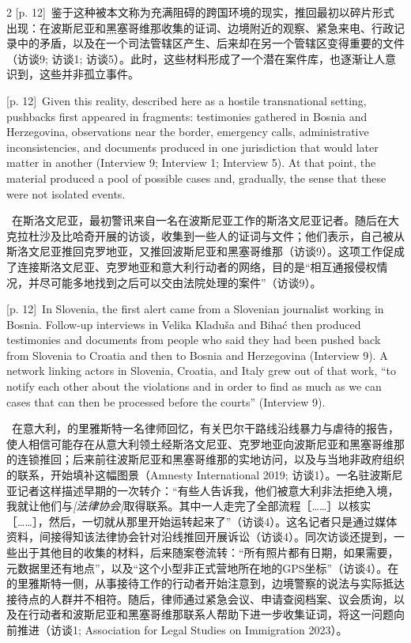 \documentclass[10pt,a4paper]{article}
\begin{document}
\begin{paracol}{2}
{\scriptsize\color{gray} [p. 12]}\ 鉴于这种被本文称为充满阻碍的跨国环境的现实，推回最初以碎片形式出现：在波斯尼亚和黑塞哥维那收集的证词、边境附近的观察、紧急来电、行政记录中的矛盾，以及在一个司法管辖区产生、后来却在另一个管辖区变得重要的文件（访谈9; 访谈1; 访谈5）。此时，这些材料形成了一个潜在案件库，也逐渐让人意识到，这些并非孤立事件。\par
\switchcolumn
{\scriptsize\color{gray} [p. 12]}\ Given this reality, described here as a hostile transnational setting, pushbacks first appeared in fragments: testimonies gathered in Bosnia and Herzegovina, observations near the border, emergency calls, administrative inconsistencies, and documents produced in one jurisdiction that would later matter in another (Interview 9; Interview 1; Interview 5). At that point, the material produced a pool of possible cases and, gradually, the sense that these were not isolated events.\par
\switchcolumn*
{\scriptsize\color{gray} [p. 12]}\ 在斯洛文尼亚，最初警讯来自一名在波斯尼亚工作的斯洛文尼亚记者。随后在大克拉杜沙及比哈奇开展的访谈，收集到一些人的证词与文件；他们表示，自己被从斯洛文尼亚推回克罗地亚，又推回波斯尼亚和黑塞哥维那（访谈9）。这项工作促成了连接斯洛文尼亚、克罗地亚和意大利行动者的网络，目的是“相互通报侵权情况，并尽可能多地找到之后可以交由法院处理的案件”（访谈9）。\par
\switchcolumn
{\scriptsize\color{gray} [p. 12]}\ In Slovenia, the first alert came from a Slovenian journalist working in Bosnia. Follow-up interviews in Velika Kladuša and Bihać then produced testimonies and documents from people who said they had been pushed back from Slovenia to Croatia and then to Bosnia and Herzegovina (Interview 9). A network linking actors in Slovenia, Croatia, and Italy grew out of that work, “to notify each other about the violations and in order to find as much as we can cases that can then be processed before the courts” (Interview 9).\par
\switchcolumn*
{\scriptsize\color{gray} [p. 12]}\ 在意大利，的里雅斯特一名律师回忆，有关巴尔干路线沿线暴力与虐待的报告，使人相信可能存在从意大利领土经斯洛文尼亚、克罗地亚向波斯尼亚和黑塞哥维那的连锁推回；后来前往波斯尼亚和黑塞哥维那的实地访问，以及与当地非政府组织的联系，开始填补这幅图景（Amnesty International 2019; 访谈1）。一名驻波斯尼亚记者这样描述早期的一次转介：“有些人告诉我，他们被意大利非法拒绝入境，我就让他们与\textit{[法律协会]}取得联系。其中一人走完了全部流程［……］以核实［……］，然后，一切就从那里开始运转起来了”（访谈4）。这名记者只是通过媒体资料，间接得知该法律协会针对沿线推回开展诉讼（访谈4）。同次访谈还提到，一些出于其他目的收集的材料，后来随案卷流转：“所有照片都有日期，如果需要，元数据里还有地点”，以及“这个小型非正式营地所在地的GPS坐标”（访谈4）。在的里雅斯特一侧，从事接待工作的行动者开始注意到，边境警察的说法与实际抵达接待点的人群并不相符。随后，律师通过紧急会议、申请查阅档案、议会质询，以及在行动者和波斯尼亚和黑塞哥维那联系人帮助下进一步收集证词，将这一问题向前推进（访谈1; Association for Legal Studies on Immigration 2023）。\par

\end{paracol}
\end{document}
